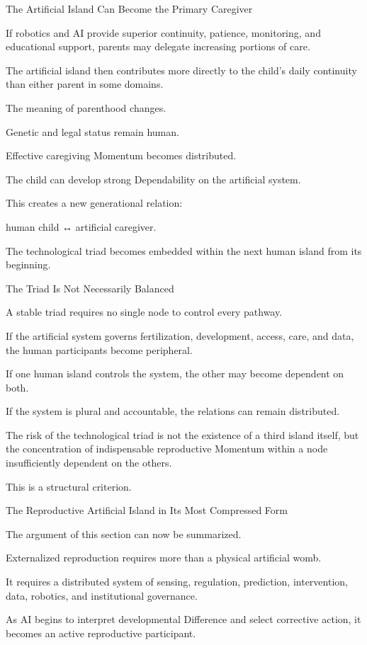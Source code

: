 The Artificial Island Can Become the Primary Caregiver

If robotics and AI provide superior continuity, patience, monitoring, and educational support, parents may delegate increasing portions of care.

The artificial island then contributes more directly to the child’s daily continuity than either parent in some domains.

The meaning of parenthood changes.

Genetic and legal status remain human.

Effective caregiving Momentum becomes distributed.

The child can develop strong Dependability on the artificial system.

This creates a new generational relation:

human child ↔ artificial caregiver.

The technological triad becomes embedded within the next human island from its beginning.

The Triad Is Not Necessarily Balanced

A stable triad requires no single node to control every pathway.

If the artificial system governs fertilization, development, access, care, and data, the human participants become peripheral.

If one human island controls the system, the other may become dependent on both.

If the system is plural and accountable, the relations can remain distributed.

The risk of the technological triad is not the existence of a third island itself, but the concentration of indispensable reproductive Momentum within a node insufficiently dependent on the others.

This is a structural criterion.

The Reproductive Artificial Island in Its Most Compressed Form

The argument of this section can now be summarized.

Externalized reproduction requires more than a physical artificial womb.

It requires a distributed system of sensing, regulation, prediction, intervention, data, robotics, and institutional governance.

As AI begins to interpret developmental Difference and select corrective action, it becomes an active reproductive participant.

